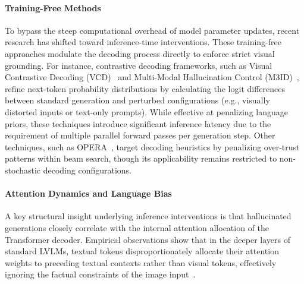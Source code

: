 \paragraph{Training-Free Methods}
To bypass the steep computational overhead of model parameter updates, recent research has shifted toward inference-time interventions. These training-free approaches modulate the decoding process directly to enforce strict visual grounding. For instance, contrastive decoding frameworks, such as Visual Contrastive Decoding (VCD)~\cite{leng2024mitigating} and Multi-Modal Hallucination Control (M3ID)~\cite{fayyaz2024m3id}, refine next-token probability distributions by calculating the logit differences between standard generation and perturbed configurations (e.g., visually distorted inputs or text-only prompts). While effective at penalizing language priors, these techniques introduce significant inference latency due to the requirement of multiple parallel forward passes per generation step. Other techniques, such as OPERA~\cite{huang2024opera}, target decoding heuristics by penalizing over-trust patterns within beam search, though its applicability remains restricted to non-stochastic decoding configurations.

\paragraph{Attention Dynamics and Language Bias}
A key structural insight underlying inference interventions is that hallucinated generations closely correlate with the internal attention allocation of the Transformer decoder. Empirical observations show that in the deeper layers of standard LVLMs, textual tokens disproportionately allocate their attention weights to preceding textual contexts rather than visual tokens, effectively ignoring the factual constraints of the image input~\cite{spin2024,wan2025only}. 

